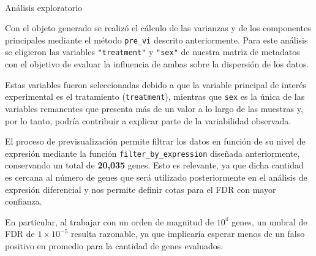 \documentclass[
  10pt,
]{article}
\makeatletter
\let\oldparagraph\paragraph
\renewcommand{\paragraph}{
    \@ifstar
      \xxxParagraphStar
      \xxxParagraphNoStar
  }
\newcommand{\xxxParagraphStar}[1]{\oldparagraph*{#1}\mbox{}}
\newcommand{\xxxParagraphNoStar}[1]{\oldparagraph{#1}\mbox{}}
\newenvironment{Shaded}{\begin{snugshade}}{\end{snugshade}}
\newcommand{\NormalTok}[1]{\textcolor[rgb]{0.00,0.23,0.31}{#1}}
\makeatother
\begin{document}
\begin{Shaded}
\end{Shaded}

\paragraph{Análisis exploratorio}\label{anuxe1lisis-exploratorio}

Con el objeto generado se realizó el cálculo de las varianzas y de los
componentes principales mediante el método \texttt{pre\_vi} descrito
anteriormente. Para este análisis se eligieron las variables
\texttt{"treatment"} y \texttt{"sex"} de nuestra matriz de metadatos con
el objetivo de evaluar la influencia de ambas sobre la dispersión de los
datos.

Estas variables fueron seleccionadas debido a que la variable principal
de interés experimental es el tratamiento (\texttt{treatment}), mientras
que \texttt{sex} es la única de las variables remanentes que presenta
más de un valor a lo largo de las muestras y, por lo tanto, podría
contribuir a explicar parte de la variabilidad observada.

\begin{Shaded}
\end{Shaded}

El proceso de previsualización permite filtrar los datos en función de
su nivel de expresión mediante la función
\texttt{filter\_by\_expression} diseñada anteriormente, conservando un
total de \textbf{20,035} genes. Esto es relevante, ya que dicha cantidad
es cercana al número de genes que será utilizado posteriormente en el
análisis de expresión diferencial y nos permite definir cotas para el
FDR con mayor confianza.

En particular, al trabajar con un orden de magnitud de \(10^4\) genes,
un umbral de FDR de \(1 \times 10^{-5}\) resulta razonable, ya que
implicaría esperar menos de un falso positivo en promedio para la
cantidad de genes evaluados.
\end{document}
